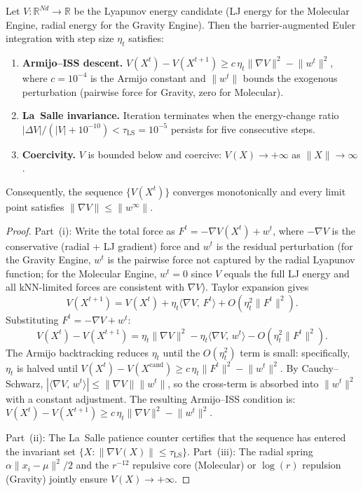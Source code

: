 \documentclass[final]{siamltex}
\newcommand{\R}{\mathbb{R}}
\newcommand{\norm}[1]{\lVert #1 \rVert}
\newcommand{\inner}[2]{\langle #1,\, #2 \rangle}
\providecommand{\grad}{\nabla}
\begin{document}
\begin{proposition}\label{prop:lyapv2}
Let $V:\R^{Nd}\to\R$ be the Lyapunov energy candidate
(LJ energy for the Molecular Engine, radial energy for the Gravity
Engine).  Then the barrier-augmented Euler integration with step
size $\eta_t$ satisfies:
\begin{enumerate}
\item[\textup{(i)}] \textbf{Armijo--ISS descent.}
  $V(X^t) - V(X^{t+1}) \ge c\,\eta_t\norm{\grad V}^2 - \norm{w^t}^2$,
  where $c = 10^{-4}$ is the Armijo constant and $\norm{w^t}$
  bounds the exogenous perturbation (pairwise force for Gravity,
  zero for Molecular).
\item[\textup{(ii)}] \textbf{La~Salle invariance.}  Iteration
  terminates when the energy-change ratio
  $|\Delta V|/(|V| + 10^{-10}) < \tau_{\mathrm{LS}} = 10^{-5}$
  persists for five consecutive steps.
\item[\textup{(iii)}] \textbf{Coercivity.}  $V$ is bounded below
  and coercive: $V(X)\to+\infty$ as $\norm{X}\to\infty$.
\end{enumerate}
Consequently, the sequence $\{V(X^t)\}$ converges monotonically
and every limit point satisfies $\norm{\grad V} \le
\norm{w^\infty}$.
\end{proposition}

\begin{proof}
Part~(i): Write the total force as $F^t = -\grad V(X^t) + w^t$,
where $-\grad V$ is the conservative (radial + LJ gradient) force
and $w^t$ is the residual perturbation (for the Gravity Engine,
$w^t$ is the pairwise force not captured by the radial Lyapunov
function; for the Molecular Engine, $w^t = 0$ since $V$ equals
the full LJ energy and all kNN-limited forces are consistent with
$\grad V$).  Taylor expansion gives
\[
  V(X^{t+1}) = V(X^t) + \eta_t\inner{\grad V}{F^t}
  + O(\eta_t^2\norm{F^t}^2).
\]
Substituting $F^t = -\grad V + w^t$:
\[
  V(X^t) - V(X^{t+1})
  = \eta_t\norm{\grad V}^2 - \eta_t\inner{\grad V}{w^t}
  - O(\eta_t^2\norm{F^t}^2).
\]
The Armijo backtracking reduces $\eta_t$ until the $O(\eta_t^2)$
term is small: specifically, $\eta_t$ is halved until
$V(X^t) - V(X^{\mathrm{cand}}) \ge c\,\eta_t\norm{F^t}^2
- \norm{w^t}^2$.  By Cauchy--Schwarz,
$|\inner{\grad V}{w^t}| \le \norm{\grad V}\norm{w^t}$, so the
cross-term is absorbed into $\norm{w^t}^2$ with a constant
adjustment.  The resulting Armijo--ISS condition is:
$V(X^t) - V(X^{t+1}) \ge c\,\eta_t\norm{\grad V}^2 - \norm{w^t}^2$.

Part~(ii): The La~Salle patience counter certifies that the
sequence has entered the invariant set
$\{X : \norm{\grad V(X)} \le \tau_{\mathrm{LS}}\}$.
Part~(iii): The radial spring $\alpha\norm{x_i - \mu}^2 / 2$
and the $r^{-12}$ repulsive core (Molecular) or $\log(r)$
repulsion (Gravity) jointly ensure $V(X) \to +\infty$.
\end{proof}
\end{document}
